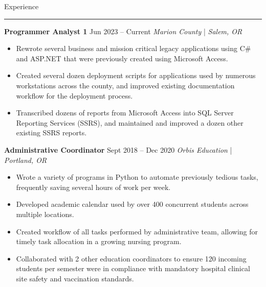 \documentclass[11pt]{article}
\newcommand{\sectiontitle}[1]{
    \noindent\Large#1
    \newline
    \vspace{-0.18in}
    \hrule   
}
\newcommand{\occupation}[4]{
    \topitemspacing
    \normalsize
    \noindent\textbf{#1}
    \hfill
    \noindent#3
    \newline
    \noindent\textit{#2} | \textit{#4}
    \toplistspacing
}
\newcommand{\sectionendspace}{
    \vspace{0.1in}
}
\newcommand{\toplistspacing}{
    \vspace{0.04in}
}
\newcommand{\topitemspacing}{
    \vspace{0.1in}
}
\begin{document}
    \sectionendspace
    \sectiontitle{Experience}
    \occupation{Programmer Analyst 1}{Marion County}
    {Jun 2023 -- Current}
    {Salem, OR}
    \begin{itemize}[noitemsep,nolistsep]
        \item Rewrote several business and mission critical legacy applications using C\# and ASP.NET that were previously created using Microsoft Access.
        \item Created several dozen deployment scripts for applications used by numerous workstations across the county, and improved existing documentation workflow for the deployment process.
        \item Transcribed dozens of reports from Microsoft Access into SQL Server Reporting Services (SSRS), and maintained and improved a dozen other existing SSRS reports.
    \end{itemize}
    \occupation{Administrative Coordinator}{Orbis Education}
    {Sept 2018 -- Dec 2020}
    {Portland, OR}
    \begin{itemize}[noitemsep,nolistsep]
        \item Wrote a variety of programs in Python to automate previously tedious tasks, frequently saving several hours of work per week.
        \item Developed academic calendar used by over 400 concurrent students across multiple locations.
        \item Created workflow of all tasks performed by administrative team, allowing for timely task allocation in a growing nursing program.
        \item Collaborated with 2 other education coordinators to ensure 120 incoming students per semester were in compliance with mandatory hospital clinical site safety and vaccination standards.
    \end{itemize}
\end{document}
